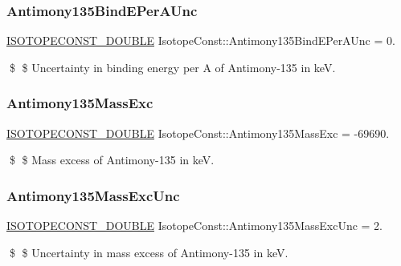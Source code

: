 \subsubsection{\texorpdfstring{Antimony135\+Bind\+E\+Per\+A\+Unc}{Antimony135BindEPerAUnc}}
{\footnotesize\ttfamily \mbox{\hyperlink{group___isotope_const-_macros_ga8f45a7272ce02c0b4c65c44636ed719a}{I\+S\+O\+T\+O\+P\+E\+C\+O\+N\+S\+T\+\_\+\+D\+O\+U\+B\+LE}} Isotope\+Const\+::\+Antimony135\+Bind\+E\+Per\+A\+Unc = 0.}

\$ \$ Uncertainty in binding energy per A of Antimony-\/135 in keV. \mbox{\label{group___isotope_const-_antimony-_sb135_gad48e14a62c409bd0fabdd59a374fe9ca}} 
\subsubsection{\texorpdfstring{Antimony135\+Mass\+Exc}{Antimony135MassExc}}
{\footnotesize\ttfamily \mbox{\hyperlink{group___isotope_const-_macros_ga8f45a7272ce02c0b4c65c44636ed719a}{I\+S\+O\+T\+O\+P\+E\+C\+O\+N\+S\+T\+\_\+\+D\+O\+U\+B\+LE}} Isotope\+Const\+::\+Antimony135\+Mass\+Exc = -\/69690.}

\$ \$ Mass excess of Antimony-\/135 in keV. \mbox{\label{group___isotope_const-_antimony-_sb135_gac4ac22496c40a131a6e6072016207cf6}} 
\subsubsection{\texorpdfstring{Antimony135\+Mass\+Exc\+Unc}{Antimony135MassExcUnc}}
{\footnotesize\ttfamily \mbox{\hyperlink{group___isotope_const-_macros_ga8f45a7272ce02c0b4c65c44636ed719a}{I\+S\+O\+T\+O\+P\+E\+C\+O\+N\+S\+T\+\_\+\+D\+O\+U\+B\+LE}} Isotope\+Const\+::\+Antimony135\+Mass\+Exc\+Unc = 2.}

\$ \$ Uncertainty in mass excess of Antimony-\/135 in keV. \mbox{\label{group___isotope_const-_antimony-_sb135_ga72fcdbc749edee8117d3cca80ec60eac}} 
